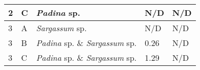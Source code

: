 \documentclass[12pt]{article}
\begin{document}
\begin{longtable}{ | p{2cm} | p{2cm} | p{3cm} | p{3.5cm} | p{3.5cm} | }
\hline
2 %
&C&\emph{Padina} sp.&N/D&N/D\\
\hline
3%
&A&%
\emph{Sargassum} sp.&N/D&N/D\\
\hline
3%
&B&\emph{Padina} sp. \& \emph{Sargassum} sp.&0.26&N/D\\
\hline
3%
&C&\emph{Padina} sp. \& \emph{Sargassum} sp.&1.29&N/D\\
\hline

\end{longtable}
\end{document}

